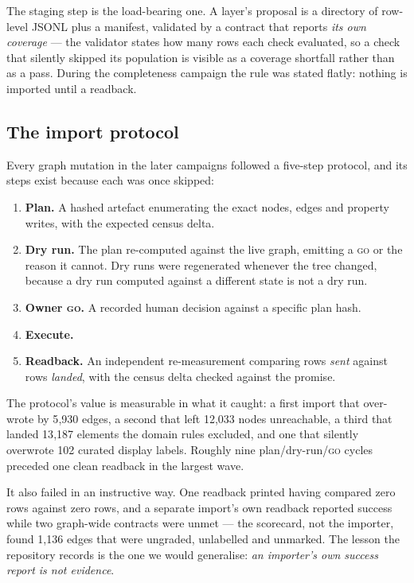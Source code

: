 The staging step is the load-bearing one. A layer's proposal is a directory of
row-level JSONL plus a manifest, validated by a contract that reports \emph{its own
coverage} --- the validator states how many rows each check evaluated, so a check
that silently skipped its population is visible as a coverage shortfall rather than
as a pass. During the completeness campaign the rule was stated flatly: nothing is
imported until a readback.

\subsection{The import protocol}
\label{sec:import}

Every graph mutation in the later campaigns followed a five-step protocol, and its
steps exist because each was once skipped:

\begin{enumerate}[leftmargin=1.9em,itemsep=1pt,topsep=2pt]
\item \textbf{Plan.} A hashed artefact enumerating the exact nodes, edges and
property writes, with the expected census delta.
\item \textbf{Dry run.} The plan re-computed against the live graph, emitting a
\textsc{go} or the reason it cannot. Dry runs were regenerated whenever the tree
changed, because a dry run computed against a different state is not a dry run.
\item \textbf{Owner \textsc{go}.} A recorded human decision against a specific plan
hash.
\item \textbf{Execute.}
\item \textbf{Readback.} An independent re-measurement comparing rows \emph{sent}
against rows \emph{landed}, with the census delta checked against the promise.
\end{enumerate}

The protocol's value is measurable in what it caught: a first import that
over-wrote by 5{,}930 edges, a second that left 12{,}033 nodes unreachable, a third
that landed 13{,}187 elements the domain rules excluded, and one that silently
overwrote 102 curated display labels. Roughly nine plan/dry-run/\textsc{go} cycles
preceded one clean readback in the largest wave.

It also failed in an instructive way. One readback printed 
having compared zero rows against zero rows, and a separate import's own readback
reported success while two graph-wide contracts were unmet --- the scorecard, not the
importer, found 1{,}136 edges that were ungraded, unlabelled and unmarked. The
lesson the repository records is the one we would generalise: \emph{an importer's own
success report is not evidence}.


